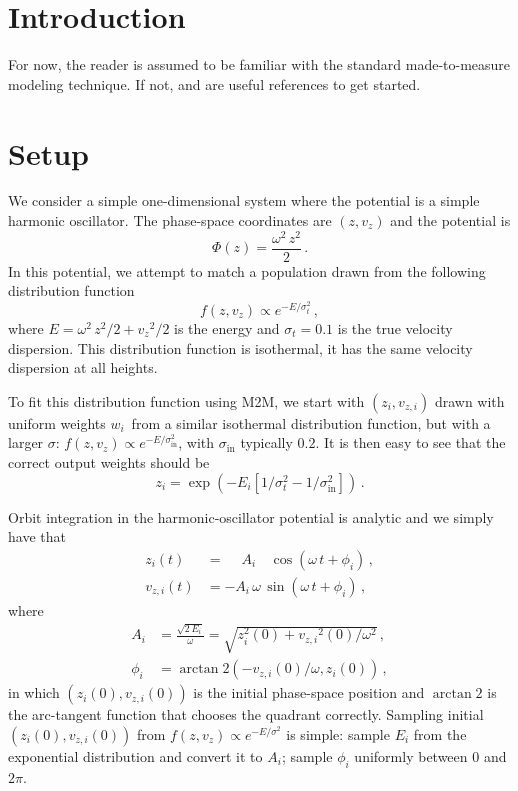 \documentclass[12pt,preprint]{aastex}
\newcommand{\vz}{\ensuremath{v_z}}
\newcommand{\vzi}{\ensuremath{v_{z,i}}}
\newcommand{\zi}{\ensuremath{z_i}}
\newcommand{\wi}{\ensuremath{w_i}}
\newcommand{\Ei}{\ensuremath{E_i}}
\newcommand{\Ai}{\ensuremath{A_i}}
\newcommand{\phii}{\ensuremath{\phi_i}}
\begin{document}
\section{Introduction}

For now, the reader is assumed to be familiar with the standard
made-to-measure modeling technique. If not, \citet{Syer96a} and
\citet{Dehnen09a} are useful references to get started.

\section{Setup}

We consider a simple one-dimensional system where the potential is a
simple harmonic oscillator. The phase-space coordinates are $(z,\vz)$
and the potential is
\begin{equation}
  \Phi(z) = \frac{\omega^2\,z^2}{2}\,.
\end{equation}
In this potential, we attempt to match a population drawn from the
following distribution function
\begin{equation}
  f(z,\vz) \propto e^{-E/\sigma_t^2}\,,
\end{equation}
where $E = \omega^2\,z^2 / 2 + \vz^2/2$ is the energy and $\sigma_t =
0.1$ is the true velocity dispersion. This distribution function is
isothermal, it has the same velocity dispersion at all heights.

To fit this distribution function using M2M, we start with
$(\zi,\vzi)$ drawn with uniform weights \wi\ from a similar isothermal
distribution function, but with a larger $\sigma$: $f(z,\vz) \propto
e^{-E/\sigma_{\mathrm{in}}^2}$, with $\sigma_{\mathrm{in}}$ typically
$0.2$. It is then easy to see that the correct output weights should
be
\begin{equation}
  \zi = \exp\left( -\Ei\left[1/\sigma_t^2-1/\sigma_{\mathrm{in}}^2\right]\right)\,.
\end{equation}

Orbit integration in the harmonic-oscillator potential is analytic and
we simply have that
\begin{align}\label{eq:zit}
  \zi(t) & = \phantom{-}\Ai\phantom{\,\omega}\,\cos\left(\omega\,t+\phii\right)\,,\\
  \vzi(t) & = -\Ai\,\omega\,\sin\left(\omega\,t+\phii\right)\,,\label{eq:vzit}
\end{align}
where
\begin{align}\label{eq:Ai}
  A_i  & = \frac{\sqrt{2\,E_i}}{\omega} = \sqrt{z_i^2(0)+\vzi^2(0)/\omega^2}\,,\\
  \phii & = \arctan\!2(-\vzi(0)/\omega,\zi(0))\,,\label{eq:phii}
\end{align}
in which $(\zi(0),\vzi(0))$ is the initial phase-space position and
$\arctan\!2$ is the arc-tangent function that chooses the quadrant
correctly. Sampling initial $(\zi(0),\vzi(0))$ from $f(z,\vz) \propto
e^{-E/\sigma^2}$ is simple: sample $\Ei$ from the exponential
distribution and convert it to $\Ai$; sample $\phii$ uniformly between
$0$ and $2\pi$.
\end{document}
